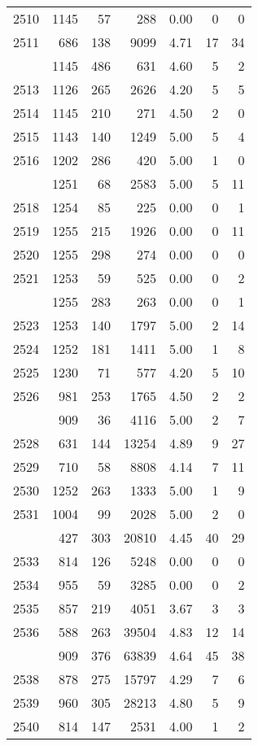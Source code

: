 \documentclass[
]{article}
\begin{document}
\begin{table}
\begin{tabular}[t]{lrrrrrr}
2510 & 1145 & 57 & 288 & 0.00 & 0 & 0\\
2511 & 686 & 138 & 9099 & 4.71 & 17 & 34\\
\addlinespace
2512 & 1145 & 486 & 631 & 4.60 & 5 & 2\\
2513 & 1126 & 265 & 2626 & 4.20 & 5 & 5\\
2514 & 1145 & 210 & 271 & 4.50 & 2 & 0\\
2515 & 1143 & 140 & 1249 & 5.00 & 5 & 4\\
2516 & 1202 & 286 & 420 & 5.00 & 1 & 0\\
\addlinespace
2517 & 1251 & 68 & 2583 & 5.00 & 5 & 11\\
2518 & 1254 & 85 & 225 & 0.00 & 0 & 1\\
2519 & 1255 & 215 & 1926 & 0.00 & 0 & 11\\
2520 & 1255 & 298 & 274 & 0.00 & 0 & 0\\
2521 & 1253 & 59 & 525 & 0.00 & 0 & 2\\
\addlinespace
2522 & 1255 & 283 & 263 & 0.00 & 0 & 1\\
2523 & 1253 & 140 & 1797 & 5.00 & 2 & 14\\
2524 & 1252 & 181 & 1411 & 5.00 & 1 & 8\\
2525 & 1230 & 71 & 577 & 4.20 & 5 & 10\\
2526 & 981 & 253 & 1765 & 4.50 & 2 & 2\\
\addlinespace
2527 & 909 & 36 & 4116 & 5.00 & 2 & 7\\
2528 & 631 & 144 & 13254 & 4.89 & 9 & 27\\
2529 & 710 & 58 & 8808 & 4.14 & 7 & 11\\
2530 & 1252 & 263 & 1333 & 5.00 & 1 & 9\\
2531 & 1004 & 99 & 2028 & 5.00 & 2 & 0\\
\addlinespace
2532 & 427 & 303 & 20810 & 4.45 & 40 & 29\\
2533 & 814 & 126 & 5248 & 0.00 & 0 & 0\\
2534 & 955 & 59 & 3285 & 0.00 & 0 & 2\\
2535 & 857 & 219 & 4051 & 3.67 & 3 & 3\\
2536 & 588 & 263 & 39504 & 4.83 & 12 & 14\\
\addlinespace
2537 & 909 & 376 & 63839 & 4.64 & 45 & 38\\
2538 & 878 & 275 & 15797 & 4.29 & 7 & 6\\
2539 & 960 & 305 & 28213 & 4.80 & 5 & 9\\
2540 & 814 & 147 & 2531 & 4.00 & 1 & 2\\

\end{tabular}
\end{table}
\end{document}
